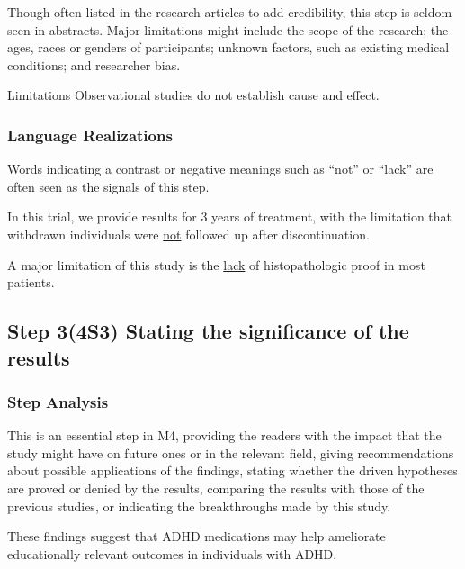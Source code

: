 \documentclass{ctexbook}
\begin{document}
    Though often listed in the research articles to add credibility, this step is seldom seen in abstracts. Major limitations might include the scope of the research; the ages, races or genders of participants; unknown factors, such as existing medical conditions; and researcher bias.

    \begin{eg}{}
      Limitations Observational studies do not establish cause and effect.
    \end{eg}

    \subsubsection{Language Realizations}

    Words indicating a contrast or negative meanings such as ``not'' or ``lack'' are often seen as the signals of this step.

    \begin{eg}{}
      In this trial, we provide results for 3 years of treatment, with the limitation that withdrawn individuals were \uline{not} followed up after discontinuation.   
    \end{eg}

    \begin{eg}{}
      A major limitation of this study is the \uline{lack} of histopathologic proof in most patients.     
    \end{eg}

  \subsection{Step 3(4S3) Stating the significance of the results}
    \subsubsection{Step Analysis}

    This is an essential step in M4, providing the readers with the impact that the study might have on future ones or in the relevant field, giving recommendations about possible applications of the findings, stating whether the driven hypotheses are proved or denied by the results, comparing the results with those of the previous studies, or indicating the breakthroughs made by this study.

    \begin{eg}{}
      These findings suggest that ADHD medications may help ameliorate educationally relevant outcomes in individuals with ADHD.
    \end{eg}
\end{document}
